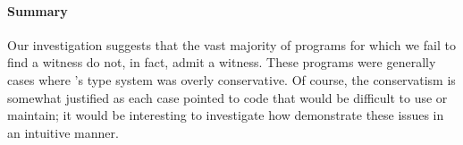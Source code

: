 \paragraph{Summary}
%
Our investigation suggests that the vast majority of programs
for which we fail to find a witness do not, in fact, admit a
witness.
%
These programs were generally cases where \ocaml's type system was
overly conservative.
%
Of course, the conservatism is somewhat justified as each case pointed
to code that would be difficult to use or maintain;
%
it would be interesting to investigate how demonstrate these issues in an
intuitive manner.


